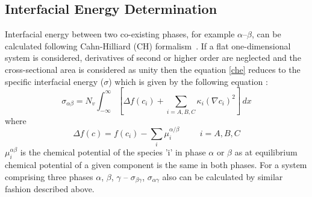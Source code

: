 \documentclass[12pt]{iiscthes}
\theoremstyle{definition}
\theoremstyle{definition}
\theoremstyle{remark}
\begin{document}
\begin{appendices}
\chapter{Interfacial Energy Determination}\label{ied}
Interfacial energy between two co-existing phases, for example $\alpha$--$\beta$, can be calculated following Cahn-Hilliard (CH) formalism~\cite{Cahn}. If a flat one-dimensional system is considered, derivatives of second or higher order are neglected and the cross-sectional area is considered as unity then the equation \ref{che} reduces to the specific interfacial energy ($\sigma$) which is given by the following equation : 
\begin{equation}\label{ge1}
\sigma_{\alpha\beta} = N_v \int_{-\infty}^{\infty}\left[\Delta f(c_i) + \sum_{i=A,B,C}\kappa_{i}\left(\nabla c_i\right)^2 \right]\, dx 
\end{equation}  
where
\begin{equation}\label{ge2}
\Delta f(c) = f(c_i) - \sum_i \mu_i^{\alpha/\beta} \hspace{1cm} i = A, B, C
\end{equation}
$\mu_i^{\alpha\beta}$ is the chemical potential of the species 'i' in phase $\alpha$ or $\beta$ as at equilibrium chemical potential of a given component is the same in both phases. For a system comprising three phases $\alpha $, $\beta $, $\gamma $ -- $ \sigma_{\beta\gamma }$,  $ \sigma_{\alpha\gamma}$ also can be calculated by similar fashion described above.
\end{appendices}


\cleardoublepage
{}


\begin{comment}

\end{comment}
\end{document}
